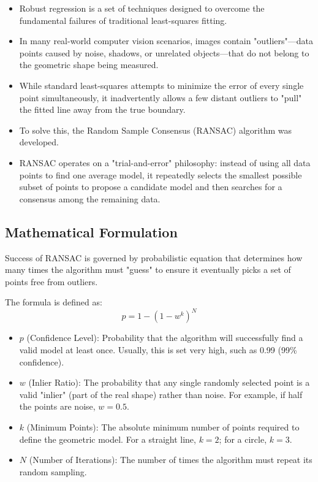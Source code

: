 \documentclass[12pt]{article}
\begin{document}
\begin{itemize}
    \item Robust regression is a set of techniques designed to overcome the fundamental failures of traditional least-squares fitting.

    \item In many real-world computer vision scenarios, images contain "outliers"—data points caused by noise, shadows, or unrelated objects—that do not belong to the geometric shape being measured.

    \item While standard least-squares attempts to minimize the error of every single point simultaneously, it inadvertently allows a few distant outliers to "pull" the fitted line away from the true boundary.

    \item To solve this, the Random Sample Consensus (RANSAC) algorithm was developed.

    \item RANSAC operates on a "trial-and-error" philosophy: instead of using all data points to find one average model, it repeatedly selects the smallest possible subset of points to propose a candidate model and then searches for a consensus among the remaining data.
\end{itemize}


\subsection{Mathematical Formulation}

Success of RANSAC is governed by probabilistic equation that determines how many times the algorithm must "guess" to ensure it eventually picks a set of points free from outliers.

The formula is defined as:
$$
    p = 1 - (1 - w^k)^N
$$

\begin{itemize}
    \item $p$ (Confidence Level): Probability that the algorithm will successfully find a valid model at least once. Usually, this is set very high, such as 0.99 (99\% confidence).

    \item $w$ (Inlier Ratio): The probability that any single randomly selected point is a valid "inlier" (part of the real shape) rather than noise. For example, if half the points are noise, $w = 0.5$.

    \item $k$ (Minimum Points): The absolute minimum number of points required to define the geometric model. For a straight line, $k=2$; for a circle, $k=3$.

    \item $N$ (Number of Iterations): The number of times the algorithm must repeat its random sampling.
\end{itemize}
\end{document}
